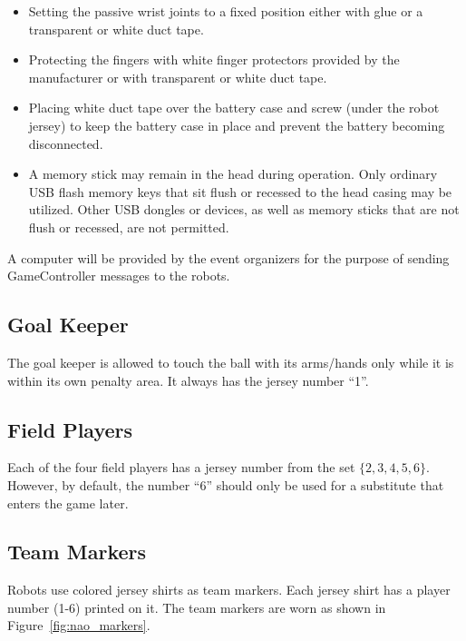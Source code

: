\documentclass[12pt]{article}
\begin{document}
\begin{itemize}
    \item Setting the passive wrist joints to a fixed position either with glue or a transparent or white duct tape.
    \item Protecting the fingers with white finger protectors provided by the manufacturer or with transparent or white duct tape.
    \item Placing white duct tape over the battery case and screw (under the robot jersey) to keep the battery case in place and prevent the battery becoming disconnected.
    \item A memory stick may remain in the head during operation.  Only ordinary USB flash memory keys that sit flush or recessed to the head casing may be utilized. Other USB dongles or devices, as well as memory sticks that are not flush or recessed, are not permitted.
\end{itemize}

A computer will be provided by the event organizers for the purpose of sending GameController messages to the robots.

\subsection{Goal Keeper}
\label{sec:goal_keeper}

The goal keeper is allowed to touch the ball with its arms/hands only while it is within its own penalty area. It always has the jersey number ``1''.

\subsection{Field Players}
\label{sec:field_players}
Each of the four field players has a jersey number from the set $\{2, 3, 4, 5, 6\}$. However, by default, the number ``6'' should only be used for a substitute that enters the game later.

\subsection{Team Markers}
\label{sec:team_markers}

Robots use colored jersey shirts as team markers. Each jersey shirt has a player number (1-6) printed on it.  The team markers are worn as shown in Figure~\ref{fig:nao_markers}.
\end{document}

